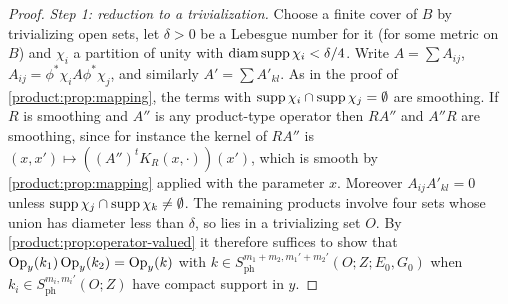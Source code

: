 \begin{proof}
\emph{Step 1: reduction to a trivialization.} Choose a finite cover of $B$ by
trivializing open sets, let $\delta>0$ be a Lebesgue number for it (for some
metric on $B$) and $\chi_i$ a partition of unity with $\operatorname{diam}
\operatorname{supp}\chi_i<\delta/4$. Write $A=\sum A_{ij}$, $A_{ij}=\phi^*\chi_iA\phi^*\chi_j$, and
similarly $A'=\sum A'_{kl}$. As in the proof of \cref{product:prop:mapping}, the
terms with $\operatorname{supp}\chi_i\cap\operatorname{supp}\chi_j=\emptyset$ are smoothing. If $R$ is
smoothing and $A''$ is any product-type operator then $RA''$ and $A''R$ are
smoothing, since for instance the kernel of $RA''$ is $(x,x')\mapsto
((A'')^tK_R(x,\cdot))(x')$, which is smooth by \cref{product:prop:mapping} applied
with the parameter $x$. Moreover $A_{ij}A'_{kl}=0$ unless
$\operatorname{supp}\chi_j\cap\operatorname{supp}\chi_k\ne\emptyset$. The remaining products involve four
sets whose union has diameter less than $\delta$, so lies in a trivializing set
$O$. By \cref{product:prop:operator-valued} it therefore suffices to show that
$\operatorname{Op}_y(k_1)\operatorname{Op}_y(k_2)=\operatorname{Op}_y(k)$ with $k\in
S^{m_1+m_2,m_1'+m_2'}_{\mathrm{ph}}(O;Z;E_0,G_0)$ when $k_i\in
S^{m_i,m_i'}_{\mathrm{ph}}(O;Z)$ have compact support in $y$.


\end{proof}
